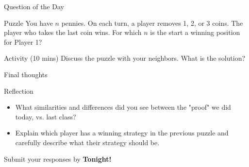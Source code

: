 \documentclass{beamer}
\begin{document}
\begin{frame}{Question of the Day}
\pause
  \begin{block}{Puzzle}
    You have $n$ pennies. On each turn, a player removes 1, 2, or 3 coins.  The player who takes the last coin wins. 
    For which $n$ is the start a winning position for {\color{blue}Player 1}?
  \end{block}
\pause
  \begin{block}{Activity (10 mins)}
    Discuss the puzzle with your neighbors.  What is the solution?
  \end{block}
\end{frame}

\begin{frame}{Final thoughts}
  \begin{block}{Reflection}
    \begin{itemize}
      \item What similarities and differences did you see between the "proof" we did today, vs. last class?
      \item Explain which player has a winning strategy in the previous puzzle and carefully describe what their strategy should be.
    \end{itemize}
  \end{block}
\begin{center}
Submit your responses by \textbf{Tonight!}
\end{center}
\end{frame}
\end{document}
